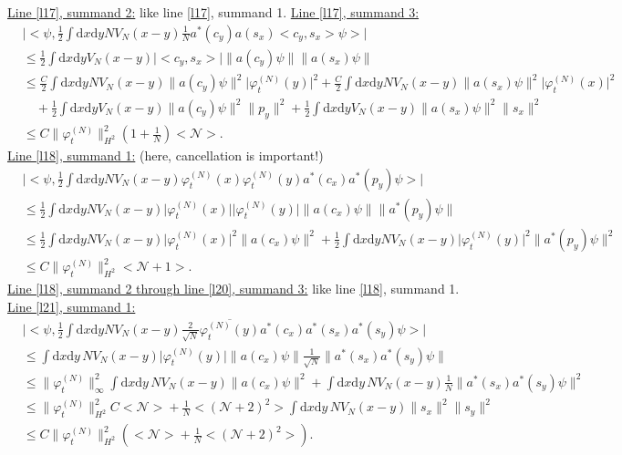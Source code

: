 \documentclass[11pt,a4paper,draft,DIV11]{scrartcl}	%
\newcommand{\di}{\textrm{d}}		%
\newcommand{\Ncal}{\mathcal{N}}		%
\newcommand{\estlist}[2]{\underline{Line \ref{l#1}, summand #2:}}
\newcommand{\nestlist}[2]{line \ref{l#1}, summand #2}
\newcommand{\Nestlist}[2]{Line \ref{l#1}, summand #2}
\newcommand{\scal}[2]{\big<#1,#2\big>} %
\newcommand{\cc}[1]{\overline{#1}}	%
\newcommand{\norm}[1]{\lVert#1\rVert}	%
\newcommand{\ev}[1]{\big<#1\big>}	%
\newcommand{\ph}{\varphi_t^{(N)}}	%
\newcommand{\dxyNV}{\frac{1}{2}\int \di x\di y N V_N(x-y)} %
\newcommand{\dxyV}{\frac{1}{2}\int \di x\di y V_N(x-y)} %
\begin{document}
\underline{\Nestlist{17}{2}:} like \nestlist{17}{1}.\newline
\estlist{17}{3}
\begin{align*}
& \lvert \scal{\psi}{\dxyNV \frac{1}{N} a^\ast(c_y) a(s_x) \scal{c_y}{s_x} \psi} \rvert \\
& \leq \dxyV \lvert \scal{c_y}{s_x} \rvert \norm{a(c_y)\psi} \norm{a(s_x)\psi} \\
& \leq \frac{C}{2}\int \di x\di y N V_N(x-y) \norm{a(c_y)\psi}^2 \lvert\ph(y)\rvert^2 + \frac{C}{2}\int \di x\di y N V_N(x-y) \norm{a(s_x)\psi}^2 \lvert \ph(x)\rvert^2 \\
& \quad + \dxyV \norm{a(c_y)\psi}^2 \norm{p_y}^2 + \dxyV \norm{a(s_x)\psi}^2 \norm{s_x}^2 \\
& \leq C \norm{\ph}_{H^2}^2 \left(1+\frac{1}{N}\right)\ev{\Ncal}.
\end{align*}
\estlist{18}{1} (here, cancellation is important!)
\begin{align*}
& \lvert \scal{\psi}{\dxyNV \ph(x)\ph(y) a^\ast(c_x) a^\ast(p_y)\psi} \rvert \\
& \leq \dxyNV \lvert\ph(x)\rvert \lvert\ph(y)\rvert \norm{a(c_x)\psi} \norm{a^\ast(p_y)\psi}\\
& \leq \dxyNV \lvert \ph(x)\rvert^2 \norm{a(c_x)\psi}^2 + \dxyNV \lvert\ph(y)\rvert^2 \norm{a^\ast(p_y)\psi}^2 \\
& \leq C\norm{\ph}_{H^2}^2 \ev{\Ncal+1}. 
\end{align*}
\underline{\Nestlist{18}{2} through \nestlist{20}{3}:} like \nestlist{18}{1}.\newline
\estlist{21}{1}
\begin{align*}
 & \lvert \scal{\psi}{\dxyNV \frac{2}{\sqrt{N}}\cc{\ph(y)}a^\ast(c_x)a^\ast(s_x)a^\ast(s_y)\psi} \rvert \\
& \leq \int \di x\di y\, NV_N(x-y) \lvert\ph(y)\rvert \norm{a(c_x)\psi}\frac{1}{\sqrt{N}}\norm{a^\ast(s_x)a^\ast(s_y)\psi} \\
& \leq \norm{\ph}_\infty^2 \int \di x\di y\, NV_N(x-y) \norm{a(c_x)\psi}^2 + \int \di x\di y\, NV_N(x-y) \frac{1}{N} \norm{a^\ast(s_x)a^\ast(s_y)\psi}^2 \\
& \leq \norm{\ph}_{H^2}^2 C \ev{\Ncal} + \frac{1}{N}\ev{(\Ncal+2)^2} \int \di x\di y\, NV_N(x-y) \norm{s_x}^2 \norm{s_y}^2 \\
& \leq C\norm{\ph}_{H^2}^2 \left( \ev{\Ncal} + \frac{1}{N}\ev{(\Ncal+2)^2} \right).
\end{align*}
\end{document}
